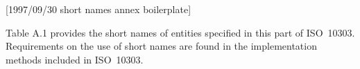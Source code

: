 [1997/09/30 short names annex boilerplate]

  Table A.1 provides the short names of entities specified in this
part of ISO~10303. Requirements on the use of short names are
found in the implementation methods included in ISO~10303.

\endinput
